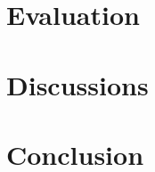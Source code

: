\documentclass[11pt]{article}
\begin{document}
\section{Evaluation}



\section{Discussions}


\section{Conclusion}







\end{document}
